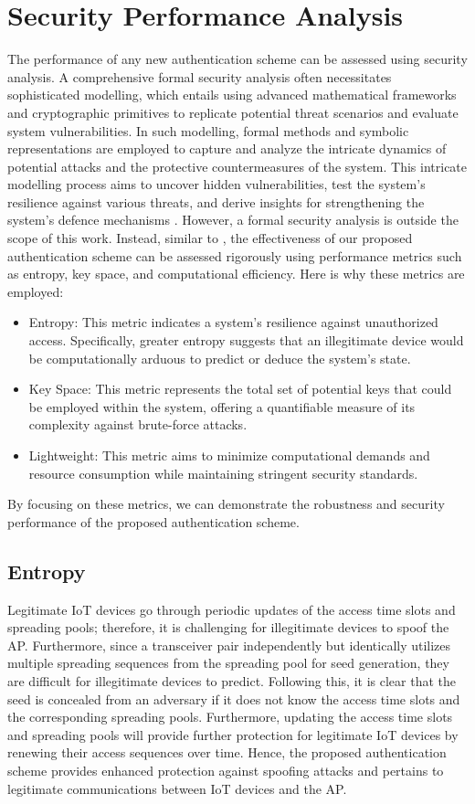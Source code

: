\documentclass[journal,10pt]{IEEEtran}
\begin{document}
\section{Security Performance Analysis}
The performance of any new authentication scheme can be assessed using security analysis. A comprehensive formal security analysis often necessitates sophisticated modelling, which entails using advanced mathematical frameworks and cryptographic primitives to replicate potential threat scenarios and evaluate system vulnerabilities. In such modelling, formal methods and symbolic representations are employed to capture and analyze the intricate dynamics of potential attacks and the protective countermeasures of the system. This intricate modelling process aims to uncover hidden vulnerabilities, test the system's resilience against various threats, and derive insights for strengthening the system's defence mechanisms \cite{9023936}. However, a formal security analysis is outside the scope of this work. Instead, similar to \cite{9378574}, the effectiveness of our proposed authentication scheme can be assessed rigorously using performance metrics such as entropy, key space, and computational efficiency. Here is why these metrics are employed:
\begin{itemize}
    \item Entropy: This metric indicates a system's resilience against unauthorized access. Specifically, greater entropy suggests that an illegitimate device would be computationally arduous to predict or deduce the system's state.
    \item Key Space: This metric represents the total set of potential keys that could be employed within the system, offering a quantifiable measure of its complexity against brute-force attacks.
    \item Lightweight: This metric aims to minimize computational demands and resource consumption while maintaining stringent security standards.
\end{itemize}
By focusing on these metrics, we can demonstrate the robustness and security performance of the proposed authentication scheme.


\subsection{Entropy} 
Legitimate IoT devices go through periodic updates of the access time slots and spreading pools; therefore, it is challenging for illegitimate devices to spoof the AP. Furthermore, since a transceiver pair independently but identically utilizes multiple spreading sequences from the spreading pool for seed generation, they are difficult for illegitimate devices to predict. Following this, it is clear that the seed is concealed from an adversary if it does not know the access time slots and the corresponding spreading pools. Furthermore, updating the access time slots and spreading pools will provide further protection for legitimate IoT devices by renewing their access sequences over time. Hence, the proposed authentication scheme provides enhanced protection against spoofing attacks and pertains to legitimate communications between IoT devices and the AP.
\end{document}
